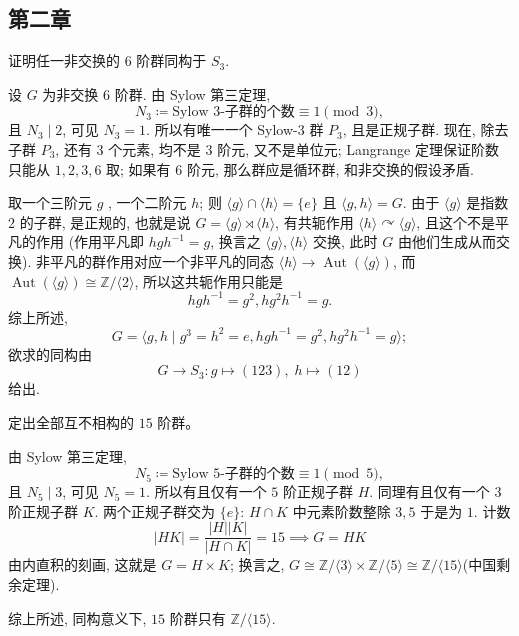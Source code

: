 \subsection{第二章}
\setcounter{pb}{21}

\begin{problem}
    证明任一非交换的 $6$ 阶群同构于 $S_3 $. 
\end{problem}

\begin{solution}
    设 $G$ 为非交换 $6$ 阶群. 由 Sylow 第三定理,  
        \[
            N_{3}\coloneqq \text{Sylow $3$-子群的个数}\equiv 1\pmod3,
        \]
    且 $N_{3}\mid 2$, 可见 $N_{3}=1$. 所以有唯一一个 Sylow-$3$ 群 $P_{3}$, 且是正规子群. 
    现在, 除去子群 $P_{3}$, 还有 $3$ 个元素, 均不是 $3$ 阶元, 又不是单位元; Langrange 定理保证阶数只能从 $1,2,3,6$ 取; 
    如果有 $6$ 阶元, 那么群应是循环群, 和非交换的假设矛盾. 
    \par 取一个三阶元 $g$ , 一个二阶元 $h$; 则 $\langle g \rangle\cap \langle h \rangle=\{e\}$ 且 $\langle g,h \rangle=G$. 
    由于 $\langle g \rangle$ 是指数 $2$ 的子群, 是正规的, 也就是说 $G=\langle g \rangle \rtimes \langle h \rangle$, 有共轭作用 $\langle h \rangle \curvearrowright \langle g \rangle$, 且这个不是平凡的作用 
    (作用平凡即 $h g h^{-1}= g$, 换言之 $\langle g \rangle, \langle h \rangle$ 交换, 此时 $G$ 由他们生成从而交换). 
    非平凡的群作用对应一个非平凡的同态 $\langle h \rangle\to \operatorname{Aut}(\langle g \rangle)$, 而 $\operatorname{Aut}(\langle g \rangle)\cong \mathbb{Z}/\langle 2 \rangle$, 
    所以这共轭作用只能是
        \[
            h g h^{-1}=g^{2}, h g^{2} h^{-1}=g.
        \]
    综上所述, 
        \[
            G=\langle g,h\mid g^{3}=h^{2}=e, h g h^{-1}=g^{2}, h g^{2} h^{-1}=g \rangle;
        \]
    欲求的同构由 
        \[
            G\to S_{3} \colon g\mapsto (1 2 3),\; h\mapsto (1 2)
        \]
    给出.
\end{solution}
\begin{problem}
    定出全部互不相构的 $15$ 阶群。
\end{problem}

\begin{solution}
    由 Sylow 第三定理,  
        \[
            N_{5}\coloneqq \text{Sylow $5$-子群的个数}\equiv 1\pmod5,
        \]
    且 $N_{5}\mid 3$, 可见 $N_{5}=1$. 所以有且仅有一个 $5$ 阶正规子群 $H$. 
    同理有且仅有一个 $3$ 阶正规子群 $K$. 两个正规子群交为 $\{e\}$: $H\cap K$ 中元素阶数整除 $3,5$ 于是为 $1$. 
    计数 
        \[
            |H K|=\frac{|H||K|}{|H\cap K|}=15\implies G= H K
        \]
    由内直积的刻画, 这就是 $G=H\times K$; 换言之, $G\cong \mathbb{Z}/\langle 3 \rangle\times\mathbb{Z}/\langle 5 \rangle\cong\mathbb{Z}/\langle 15 \rangle$(中国剩余定理). 
    \par 综上所述, 同构意义下, $15$ 阶群只有 $\mathbb{Z}/\langle 15 \rangle$.
\end{solution}

